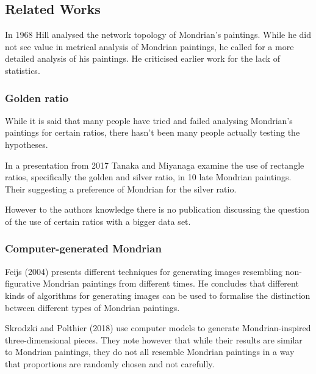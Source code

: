 
\subsection{Related Works}


In 1968 Hill \cite{Hill1968} analysed the network topology of Mondrian's paintings.
While he did not see value in metrical analysis of Mondrian paintings, he called
for a more detailed analysis of his paintings. He criticised earlier work for
the lack of statistics.

\subsubsection{Golden ratio}

\cite{Livio2002}

While it is said that many people have tried and failed analysing Mondrian's
paintings for certain ratios, there hasn't been many people actually testing
the hypotheses.

In a presentation from 2017 Tanaka and Miyanaga \cite{Tanaka2017} examine the use
of rectangle ratios, specifically the golden and silver ratio, in 10 late
Mondrian paintings. Their suggesting a preference of Mondrian for the silver
ratio.

However to the authors knowledge there is no publication discussing the question of
the use of certain ratios with a bigger data set.

\subsubsection{Computer-generated Mondrian}



Feijs (2004)\cite{Feijs2004} presents different techniques for generating images
resembling non-figurative Mondrian paintings from different times. He  concludes
that different kinds of algorithms for generating images can be used to
formalise the distinction between different types of Mondrian paintings.


Skrodzki and Polthier (2018) \cite{Skrodzki2018} use computer models to generate
Mondrian-inspired three-dimensional pieces. They note however that while their
results are similar to Mondrian paintings, they do not all resemble Mondrian
paintings in a way that proportions are randomly chosen and not carefully.
